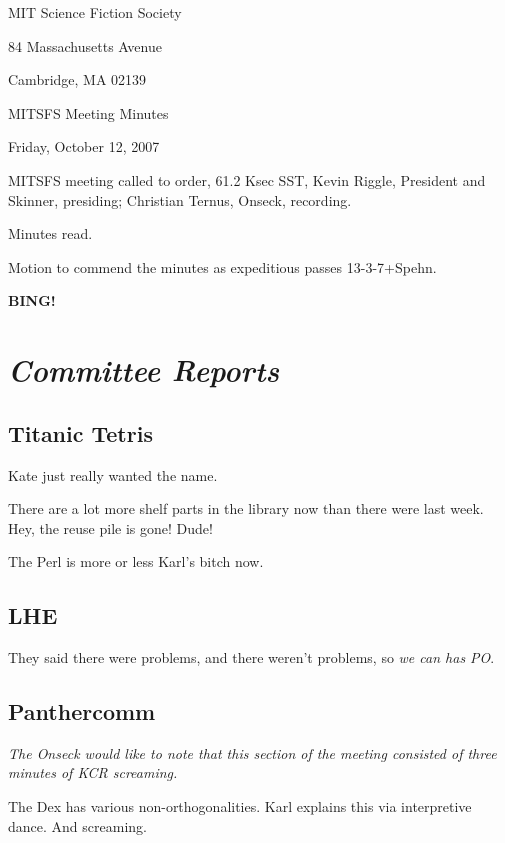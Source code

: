 \documentclass[10pt]{article}
\newcommand{\bing}{{\bf BING!} }
\newcommand{\goto}[1]{\bing \vskip 12pt \section*{{\em{#1}}}}
\begin{document}
\begin{center}

MIT Science Fiction Society

84 Massachusetts Avenue

Cambridge, MA 02139

\vspace{12pt}

MITSFS Meeting Minutes

Friday, October 12, 2007

\end{center}

\vspace{18pt}

\setlength{\parskip}{6pt}

\noindent
MITSFS meeting called to order, 61.2 Ksec SST,
Kevin Riggle, President and Skinner, presiding; Christian Ternus, Onseck, recording.

Minutes read.

Motion to commend the minutes as expeditious passes 13-3-7+Spehn.

\BING

\goto{Committee Reports}

\subsection*{Titanic Tetris}

Kate just really wanted the name.

There are a lot more shelf parts in the library now than there were last week.  Hey, the reuse pile is gone!  Dude!

The Perl is more or less Karl's bitch now.

\subsection*{LHE}

They said there were problems, and there weren't problems, so \emph{we can has PO}.

\subsection*{Panthercomm}

\emph{The Onseck would like to note that this section of the meeting consisted of three minutes of KCR screaming.}

The Dex has various non-orthogonalities.  Karl explains this via interpretive dance.  And screaming.
\end{document}
